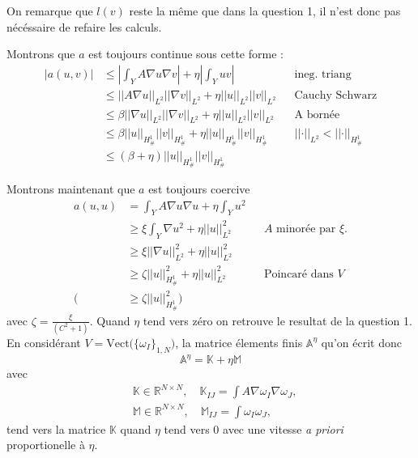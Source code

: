 \documentclass[11pt]{article}
\newcommand{\Am}{\mathbb{A}}
\newcommand{\R}{\mathbb{R}}
\newcommand{\K}{\mathbb{K}}
\newcommand{\M}{\mathbb{M}}
\newcommand{\norm}[1]{\left|\left|#1\right|\right|}
\newcommand{\Hd}{H^1_{\#}}
\begin{document}
On remarque que $l(v)$ reste la même que dans la question 1, il n'est donc pas nécéssaire de refaire les calculs.

Montrons que $a$ est toujours continue sous cette forme :
\begin{align}
  \label{eq:ac}
  \big|a(u,v)\big| &\leq \left| \int_Y A \nabla u \nabla v \right| + \eta \left| \int_Y  u v \right| && \mbox{ineg. triang} \\
                   &\leq \norm{A\nabla u}_{L^2} \norm{\nabla v}_{L^2} + \eta \norm{u}_{L^2} \norm{v}_{L^2} && \mbox{Cauchy Schwarz} \\
                   &\leq \beta \norm{\nabla u}_{L^2} \norm{\nabla v}_{L^2} + \eta \norm{u}_{L^2} \norm{v}_{L^2} && \mbox{A bornée} \\
                   &\leq \beta \norm{u}_{\Hd} \norm{v}_{\Hd} + \eta \norm{u}_{\Hd} \norm{v}_{\Hd} && \norm{\cdot}_{L^2}<\norm{\cdot}_{\Hd} \\
                   &\leq (\beta + \eta) \norm{u}_{\Hd} \norm{v}_{\Hd}
\end{align}

Montrons maintenant que $a$ est toujours coercive
\begin{align}
  \label{eq:co}
  a(u,u) &= \int_Y A \nabla u  \nabla u + \eta \int_Y u^2 \\
         &\geq \xi \int_Y \nabla u^2 + \eta \norm{u}^2_{L^2} && \text{$A$ minorée par $\xi$.}\\
         &\geq \xi \norm{\nabla u}^2_{L^2} + \eta \norm{u}^2_{L^2} \\
         &\geq \zeta \norm{u}^2_{\Hd} + \eta \norm{ u}^2_{L^2} && \text{Poincaré dans }V\\
    \big(&\geq \zeta  \norm{u}^2_{\Hd}\big)
\end{align} 
avec $\zeta = \frac{\xi}{(C^2+1)}$. Quand $\eta$ tend vers zéro on retrouve le resultat de la question 1. En considérant $V = \text{Vect}\big(\{\omega_I\}_{1,N})$, la matrice élements finis $\Am^{\eta}$ qu'on écrit donc
\begin{equation}
  \Am^{\eta} = \K + \eta \M 
\end{equation}
avec
\begin{align}
  &\K \in \R^{N\times N},\quad \K_{IJ} = \int A \nabla \omega_I \nabla \omega_J,  \\
  &\M \in \R^{N\times N},\quad \M_{IJ} = \int \omega_I \omega_J,
\end{align}
tend vers la matrice $\K$ quand $\eta$ tend vers $0$ avec une vitesse \emph{a priori} proportionelle à $\eta$.
\end{document}

